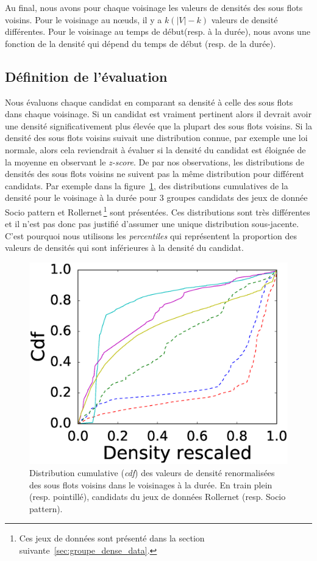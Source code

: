 Au final, nous avons pour chaque voisinage les valeurs de densités des sous flots voisins.
Pour le voisinage au n\oe uds, il y a $k(|V|-k)$ valeurs de densité différentes.
Pour le voisinage au temps de début(resp. à la durée), nous avons une fonction de la densité qui dépend du temps de début (resp. de la durée).


\subsection{Définition de l'évaluation}
Nous évaluons chaque candidat en comparant sa densité à celle des sous flots dans chaque voisinage.
Si un candidat est vraiment pertinent alors il devrait avoir une densité significativement plus élevée que la plupart des sous flots voisins.
Si la densité des sous flots voisins suivait une distribution connue, par exemple une loi normale, alors cela reviendrait à évaluer si la densité du candidat est éloignée de la moyenne en observant le \emph{z-score}.
De par nos observations, les distributions de densités des sous flots voisins ne suivent pas la même distribution pour différent candidats.
Par exemple dans la figure~\ref{fig:distrib_dens}, des distributions cumulatives de la densité pour le voisinage à la durée pour 3 groupes candidats des jeux de donnée Socio pattern et Rollernet\,\footnote{Ces jeux de données sont présenté dans la section suivante~\ref{sec:groupe_dense_data}.} sont présentées.
Ces distributions sont très différentes et il n'est pas donc pas justifié d'assumer une unique distribution sous-jacente.
C'est pourquoi nous utilisons les \emph{percentiles} qui représentent la proportion des valeurs de densités qui sont inférieures à la densité du candidat.


\begin{figure}
\centering
\includegraphics[width=0.3\linewidth]{img/GroupeDense/cdf_density_duration.eps}
\caption{Distribution cumulative (\emph{cdf}) des valeurs de densité renormalisées  des sous flots voisins dans le voisinages à la durée.
En train plein (resp. pointillé), candidats du jeux de données Rollernet (resp. Socio pattern).}
\label{fig:distrib_dens}
\end{figure}

